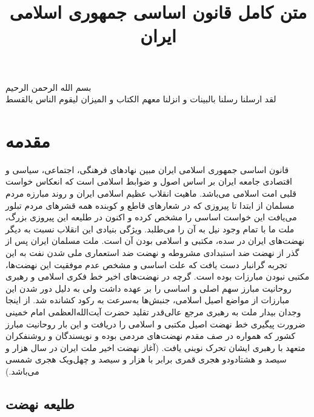 \documentclass[12pt]{article}
\title{متن كامل قانون اساسی جمهوری اسلامی ایران}
\date{}
\begin{document}
	\maketitle
	\begin{center}
		\begin{large}
		بسم الله الرحمن الرحیم
		\\
		\vspace{3mm}
		لقد ارسلنا رسلنا بالبینات و انزلنا معهم الکتاب و المیزان لیقوم الناس بالقسط
		\end{large}
	\end{center}


\section{مقدمه}
‌قانون اساسی جمهوری اسلامی ایران مبین نهادهای فرهنگی‌، اجتماعی‌، سیاسی و اقتصادی جامعه ایران بر اساس اصول و ضوابط ‌اسلامی است که انعکاس خواست قلبی امت اسلامی می‌باشد. ماهیت انقلاب عظیم اسلامی ایران و روند مبارزه مردم مسلمان از ابتدا تا پیروزی که در شعارهای قاطع و کوبنده همه قشرهای مردم ‌تبلور می‌یافت این خواست اساسی را مشخص کرده و اکنون در طلیعه این پیروزی بزرگ‌، ملت ما با تمام وجود نیل به آن را می‌طلبد. ویژگی بنیادی این انقلاب نسبت به دیگر نهضت‌های ایران در سده، مکتبی و اسلامی بودن آن است‌. ملت مسلمان ایران پس از گذر از نهضت ضد استبدادی مشروطه و نهضت ضد استعماری ملی شدن نفت به این تجربه گرانبار دست یافت که علت اساسی و مشخص عدم موفقیت این نهضت‌ها، مکتبی نبودن مبارزات بوده است‌. گرچه در نهضت‌های اخیر خط فکری اسلامی و رهبری روحانیت مبارز سهم اصلی و اساسی را بر عهده داشت ولی به دلیل دور شدن این مبارزات ‌از مواضع اصیل اسلامی‌، جنبش‌ها به‌سرعت به رکود کشانده شد. از اینجا وجدان بیدار ملت به رهبری مرجع عالی‌قدر تقلید حضرت آیت‌الله‌العظمی امام خمینی ضرورت پیگیری خط نهضت اصیل‌ مکتبی و اسلامی را دریافت و این بار روحانیت مبارز کشور که همواره در صف مقدم نهضت‌های مردمی بوده و نویسندگان و روشنفکران متعهد با رهبری ایشان تحرک نوینی یافت‌. (آغاز نهضت اخیر ملت ایران در سال هزار و سیصد و هشتادودو هجری قمری‌ برابر با هزار و سیصد و چهل‌ویک هجری شمسی می‌باشد.)
\subsection*{طلیعه نهضت}
\end{document}
